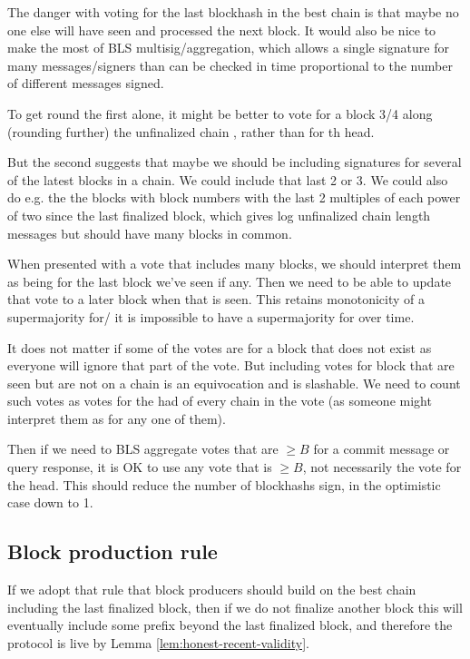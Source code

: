 \documentclass[a4paper,UKenglish,cleveref, autoref, thm-restate, anonymous]{lipics-v2019}
\begin{document}
{The danger with voting for the last blockhash in the best chain is that maybe no one else will have seen and processed the next block. It would also be nice to make the most of BLS multisig/aggregation, which allows a single signature for many messages/signers than can be checked in time proportional to the number of different messages signed. 

To get round the first alone, it might be better to vote for a block 3/4 along (rounding further) the unfinalized chain , rather than for th head.

But the second suggests that maybe we should be including signatures for several of the latest blocks in a chain. We could include that last 2 or 3. We could also do e.g. the the blocks with block numbers with the last 2 multiples of each power of two since the last finalized block, which gives log unfinalized chain length messages but should have many blocks in common.

When presented with a vote that includes many blocks, we should interpret them as being for the last block we've seen if any. Then we need to be able to update that vote to a later block when that is seen. This retains monotonicity of a supermajority for/ it is impossible to have a supermajority for over time.

It does not matter if some of the votes are for a block that does not exist as everyone will ignore that part of the vote. But including votes for block that are seen but are not on a chain is an equivocation and is slashable. We need to count such votes as votes for the had of every chain in the vote (as someone might interpret them as for any one of them).

Then if we need to BLS aggregate votes that are $\geq B$ for a commit message or query response, it is OK to use any vote that is $\geq B$, not necessarily the vote for the head. This should reduce the number of blockhashs sign, in the optimistic case down to 1.

\subsection{  Block production rule}

If we adopt that rule that block producers should build on the best chain including the last finalized block, then if we do not finalize another block this will eventually include some prefix  beyond the last finalized block, and therefore the protocol is live by Lemma \ref{lem:honest-recent-validity}.

}
\end{document}
